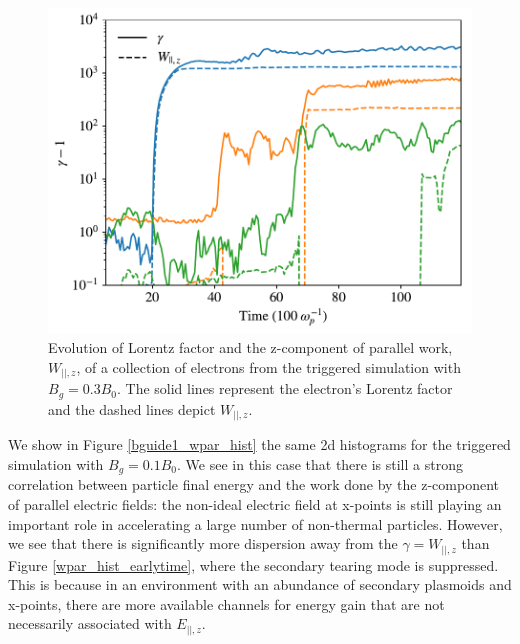 \documentclass[iop,twocolappendix]{emulateapj}
\begin{document}
\begin{figure}[htp]
\includegraphics[width=\linewidth]{manypart_wparz_handselect2_lessprt.pdf}
\caption{Evolution of Lorentz factor and the z-component of parallel work, $W_{||,z}$, of a collection of electrons from the triggered simulation with $B_{g}=0.3B_{0}$.  The solid lines represent the electron's Lorentz factor and the dashed lines depict $W_{||,z}$.  }
\label{EdotV}
\end{figure}

We show in Figure \ref{bguide1_wpar_hist} the same 2d histograms for the triggered simulation with $B_{g}=0.1 B_{0}$.  We see in this case that there is still a strong correlation between particle final energy and the work done by the z-component of parallel electric fields: the non-ideal electric field at x-points is still playing an important role in accelerating a large number of non-thermal particles.  However, we see that there is significantly more dispersion away from the $\gamma = W_{||,z}$ than Figure \ref{wpar_hist_earlytime}, where the secondary tearing mode is suppressed.  This is because in an environment with an abundance of secondary plasmoids and x-points, there are more available channels for energy gain that are not necessarily associated with $E_{||,z}$.  
\end{document}
